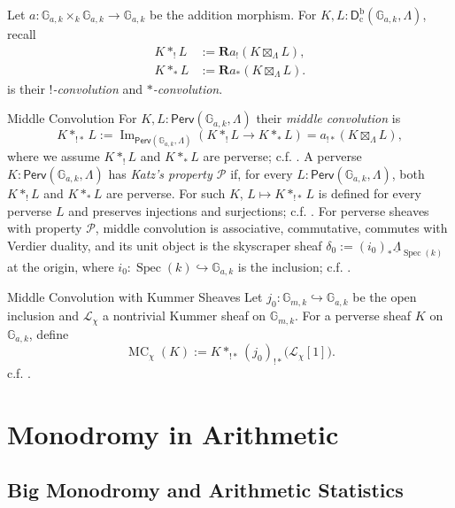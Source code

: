 \documentclass[11pt,letterpaper]{article}
\theoremstyle{numberfirstplain}
\numberwithin{equation}{theorem}
\theoremstyle{numberfirstupright}
\begin{document}
Let
$
a:\mathbb G_{a,k}\times_k\mathbb G_{a,k}\longrightarrow\mathbb G_{a,k}
$
be the addition morphism. For $K,L:\mathsf D_{\mathrm c}^{\mathrm b}(\mathbb G_{a,k},\Lambda)$, recall 
\[
\begin{aligned}
K*_!L&:=\mathbf Ra_!(K\boxtimes_\Lambda L),\\
K*_*L&:=\mathbf Ra_*(K\boxtimes_\Lambda L).
\end{aligned}
\]
is their \textit{$!$-convolution} and \textit{$*$-convolution}. 

\begin{custom}{Middle Convolution}\label{def:middle-convolution}
For $K,L:\mathsf{Perv}(\mathbb G_{a,k},\Lambda)$ their \textit{middle convolution} is
\[
K*_{!*}L:=\operatorname{Im}_{\mathsf{Perv}(\mathbb G_{a,k},\Lambda)}
\left(K*_!L\longrightarrow K*_*L\right)
=a_{!*}(K\boxtimes_\Lambda L),
\]
where we assume $K*_!L$ and $K*_*L$ are perverse; c.f. \cite[\S2.6.2]{Katz1996}.
A perverse $K:\mathsf{Perv}(\mathbb G_{a,k},\Lambda)$ has \textit{Katz's property $\mathcal P$} if, for every $L:\mathsf{Perv}(\mathbb G_{a,k},\Lambda)$, both $K*_!L$ and $K*_*L$ are perverse.
For such $K$, $L\mapsto K*_{!*}L$ is defined for every perverse $L$ and preserves injections and surjections; c.f. \cite[\S2.6.1--2]{Katz1996}.
For perverse sheaves with property $\mathcal P$, middle convolution is associative, commutative, commutes with Verdier duality, and its unit object is the skyscraper sheaf $\delta_0:=(i_0)_*\underline{\Lambda}_{\operatorname{Spec}(k)}$ at the origin, where $i_0:\operatorname{Spec}(k)\hookrightarrow\mathbb G_{a,k}$ is the inclusion; c.f. \cite[\S2.5.1, \S2.5.3(1), and Lemma~2.6.5]{Katz1996}.
\end{custom}

\begin{custom}{Middle Convolution with Kummer Sheaves}
Let $j_0:\mathbb G_{m,k}\hookrightarrow\mathbb G_{a,k}$ be the open inclusion and $\mathcal L_\chi$ a nontrivial Kummer sheaf on $\mathbb G_{m,k}$. For a perverse sheaf $K$ on $\mathbb G_{a,k}$, define
\[
\operatorname{MC}_\chi(K):=K*_{!*}(j_0)_{!*}\bigl(\mathcal L_\chi[1]\bigr).
\]
c.f. \cite[\S2.9]{Katz1996}.
\end{custom}



\section{Monodromy in Arithmetic}\label{sec:hyperelliptic-monodromy}
\subsection{Big Monodromy and Arithmetic Statistics}
\end{document}
